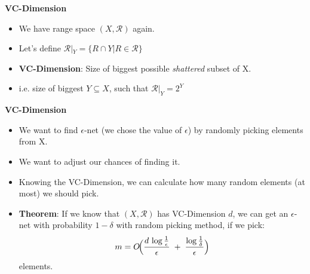 \documentclass{beamer}
\begin{document}
\begin{frame}{\textbf{VC-Dimension}}
    \begin{itemize}
        \item We have range space \((X,\mathcal{R})\) again.
        \vspace{0.2cm}
        \item Let's define  \( \mathcal{R}|_Y = \bigl\{ R \cap Y | R \in \mathcal{R} \bigr\} \)
        \vspace{0.2cm}
        \item \textbf{VC-Dimension}: Size of biggest possible \textit{shattered} subset of X. 
        \vspace{0.2cm}
        \item i.e. size of biggest \(Y \subseteq X\), such that \( \mathcal{R}|_Y = 2^Y \)
    \end{itemize}
\end{frame}

\begin{frame}{\textbf{VC-Dimension}}
    \begin{itemize}
        \item We want to find $\epsilon$-net (we chose the value of $\epsilon$) by randomly picking elements from X.
        \vspace{0.2cm}
        \item We want to adjust our chances of finding it.
        \vspace{0.2cm}
        \item Knowing the VC-Dimension, we can calculate how many random elements (at most) we should pick. 
        \vspace{0.2cm}
        \item \textbf{Theorem}: If we know that \( (X,\mathcal{R}) \) has VC-Dimension $d$, we can get an $\epsilon$-net with probability $1-\delta$ with random picking method, if we pick:
       \[
m = O\!\Bigl(\frac{d\,\log\frac{1}{\epsilon}}{\epsilon}
     \;+\;\frac{\log\frac{1}{\delta}}{\epsilon}\Bigr)
\]
elements.

    \end{itemize}
\end{frame}
\end{document}
